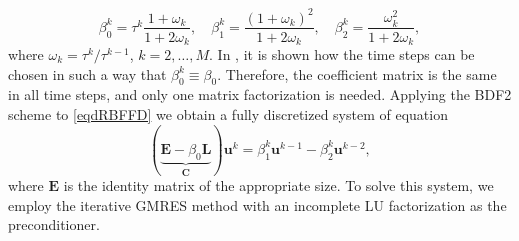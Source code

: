\documentclass{UUThesisTemplate}
\begin{document}
\begin{equation}
\label{eq:timeweights}
\beta_0^k = \tau^k\frac{1+\omega_k}{1+2\omega_k},\quad
\beta_1^k = \frac{(1+\omega_k)^2}{1+2\omega_k},\quad
\beta_2^k = \frac{\omega_k^2}{1+2\omega_k},
\end{equation}
where $\omega_k=\tau^k/\tau^{k-1}$, $k=2,\ldots,M$. In \cite{larsson2008multi}, it is shown how the time steps can be chosen in such a way that $\beta_0^k\equiv \beta_0$. Therefore, the coefficient matrix is the same in all time steps, and only one matrix factorization is needed. Applying the BDF2 scheme to \eqref{eqdRBFFD} we obtain a fully discretized system of equation
\begin{equation}
(\underbrace{\mathbf{E}-\beta_0 \mathbf{L}}_{\mathbf{C}})
\mathbf{u}^k
= \beta_1^k\mathbf{u}^{k-1} - \beta_2^k\mathbf{u}^{k-2},
\label{impl:system}
\end{equation}
where $\mathbf{E}$ is the identity matrix of the appropriate size. To solve this system, we employ the iterative GMRES method with an incomplete LU factorization as the preconditioner.
\end{document}
